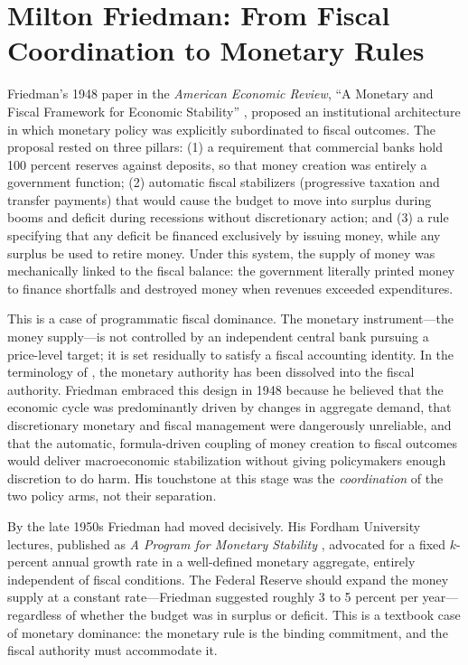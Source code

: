 \documentclass[12pt]{article}
\begin{document}
\section{Milton Friedman: From Fiscal Coordination to Monetary Rules}

Friedman's 1948 paper in the \textit{American Economic Review},
``A Monetary and Fiscal Framework for Economic Stability''
\citep{Friedman1948}, proposed an institutional architecture in which
monetary policy was explicitly subordinated to fiscal outcomes.  The
proposal rested on three pillars: (1) a requirement that commercial banks
hold 100 percent reserves against deposits, so that money creation was
entirely a government function; (2) automatic fiscal stabilizers
(progressive taxation and transfer payments) that would cause the budget
to move into surplus during booms and deficit during recessions without
discretionary action; and (3) a rule specifying that any deficit be
financed exclusively by issuing money, while any surplus be used to
retire money.  Under this system, the supply of money was mechanically
linked to the fiscal balance: the government literally printed money
to finance shortfalls and destroyed money when revenues exceeded
expenditures.

This is a case of programmatic fiscal dominance.  The monetary
instrument---the money supply---is not controlled by an independent
central bank pursuing a price-level target; it is set residually to
satisfy a fiscal accounting identity.  In the terminology of
\citet{Sargent2011}, the monetary authority has been dissolved into
the fiscal authority.  Friedman embraced this design in 1948 because he
believed that the economic cycle was predominantly driven by changes in
aggregate demand, that discretionary monetary and fiscal management were
dangerously unreliable, and that the automatic, formula-driven coupling
of money creation to fiscal outcomes would deliver macroeconomic
stabilization without giving policymakers enough discretion to do harm.
His touchstone at this stage was the \textit{coordination} of the two
policy arms, not their separation.

By the late 1950s Friedman had moved decisively.  His Fordham University
lectures, published as \textit{A Program for Monetary Stability}
\citep{Friedman1960}, advocated for a fixed $k$-percent annual growth
rate in a well-defined monetary aggregate, entirely independent of
fiscal conditions.  The Federal Reserve should expand the money supply
at a constant rate---Friedman suggested roughly 3 to 5 percent per
year---regardless of whether the budget was in surplus or deficit.
This is a textbook case of monetary dominance: the monetary rule is the
binding commitment, and the fiscal authority must accommodate it.
\end{document}
